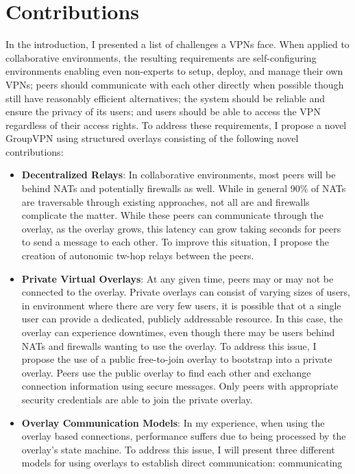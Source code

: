 \section{Contributions}
In the introduction, I presented a list of challenges a VPNs face.  When
applied to collaborative environments, the resulting requirements are 
self-configuring environments enabling even non-experts to setup, deploy,
and manage their own VPNs; peers should communicate with each other
directly when possible though still have reasonably efficient alternatives;
the system should be reliable and ensure the privacy of its users; and
users should be able to access the VPN regardless of their access rights.
To address these requirements, I propose a novel GroupVPN using structured
overlays consisting of the following novel contributions:

\begin{itemize}
\item \textbf{Decentralized Relays}:  In collaborative environments, most peers
will be behind NATs and potentially firewalls as well.  While in general 90\% of
NATs are traversable through existing approaches, not all are and firewalls
complicate the matter.  While these peers can communicate through the overlay,
as the overlay grows, this latency can grow taking seconds for peers to send
a message to each other.  To improve this situation, I propose the creation of
autonomic tw-hop relays between the peers.
\item \textbf{Private Virtual Overlays}:  At any given time, peers may or may
not be connected to the overlay.  Private overlays can consist of varying sizes
of users, in environment where there are very few users, it is possible that
ot a single user can provide a dedicated, publicly addressable  resource.  In
this case, the overlay can experience downtimes, even though there may be users
behind NATs and firewalls wanting to use the overlay.  To address this issue,
I propose the use of a public free-to-join overlay to bootstrap into a private
overlay.  Peers use the public overlay to find each other and exchange connection
information using secure messages.  Only peers with appropriate security
credentials are able to join the private overlay.
\item \textbf{Overlay Communication Models}: In my experience, when using the
overlay based connections, performance suffers due to being processed by the
overlay's state machine.  To address this issue, I will present three different
models for using overlays to establish direct communication:  communicating

\end{itemize}
